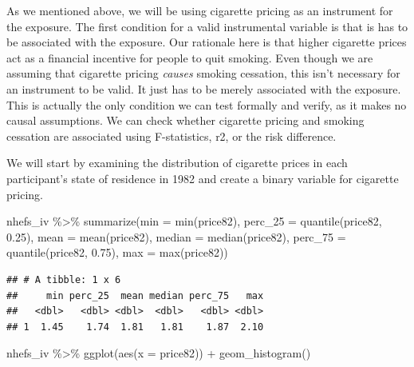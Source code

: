 \documentclass[
]{book}
\newenvironment{Shaded}{\begin{snugshade}}{\end{snugshade}}
\newcommand{\AttributeTok}[1]{\textcolor[rgb]{0.77,0.63,0.00}{#1}}
\newcommand{\FloatTok}[1]{\textcolor[rgb]{0.00,0.00,0.81}{#1}}
\newcommand{\FunctionTok}[1]{\textcolor[rgb]{0.00,0.00,0.00}{#1}}
\newcommand{\NormalTok}[1]{#1}
\newcommand{\SpecialCharTok}[1]{\textcolor[rgb]{0.00,0.00,0.00}{#1}}
\begin{document}
As we mentioned above, we will be using cigarette pricing as an instrument for the exposure. The first condition for a valid instrumental variable is that is has to be associated with the exposure. Our rationale here is that higher cigarette prices act as a financial incentive for people to quit smoking. Even though we are assuming that cigarette pricing \emph{causes} smoking cessation, this isn't necessary for an instrument to be valid. It just has to be merely associated with the exposure. This is actually the only condition we can test formally and verify, as it makes no causal assumptions. We can check whether cigarette pricing and smoking cessation are associated using F-statistics, r2, or the risk difference.

We will start by examining the distribution of cigarette prices in each participant's state of residence in 1982 and create a binary variable for cigarette pricing.

\begin{Shaded}
\begin{Highlighting}[]
\NormalTok{nhefs\_iv }\SpecialCharTok{\%\textgreater{}\%} 
  \FunctionTok{summarize}\NormalTok{(}\AttributeTok{min =} \FunctionTok{min}\NormalTok{(price82), }
            \AttributeTok{perc\_25 =} \FunctionTok{quantile}\NormalTok{(price82, }\FloatTok{0.25}\NormalTok{), }
            \AttributeTok{mean =} \FunctionTok{mean}\NormalTok{(price82), }
            \AttributeTok{median =} \FunctionTok{median}\NormalTok{(price82),}
            \AttributeTok{perc\_75 =} \FunctionTok{quantile}\NormalTok{(price82, }\FloatTok{0.75}\NormalTok{), }
            \AttributeTok{max =} \FunctionTok{max}\NormalTok{(price82))}
\end{Highlighting}
\end{Shaded}

\begin{verbatim}
## # A tibble: 1 x 6
##     min perc_25  mean median perc_75   max
##   <dbl>   <dbl> <dbl>  <dbl>   <dbl> <dbl>
## 1  1.45    1.74  1.81   1.81    1.87  2.10
\end{verbatim}

\begin{Shaded}
\begin{Highlighting}[]
\NormalTok{nhefs\_iv }\SpecialCharTok{\%\textgreater{}\%} 
  \FunctionTok{ggplot}\NormalTok{(}\FunctionTok{aes}\NormalTok{(}\AttributeTok{x =}\NormalTok{ price82)) }\SpecialCharTok{+} 
  \FunctionTok{geom\_histogram}\NormalTok{()}
\end{Highlighting}
\end{Shaded}
\end{document}
